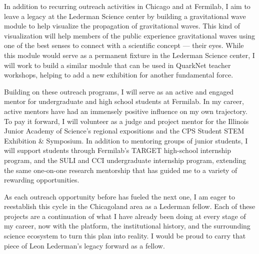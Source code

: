 \documentclass[11pt]{article}
\begin{document}
In addition to recurring outreach activities in Chicago and at Fermilab, I aim to leave a legacy at the Lederman Science center by building a gravitational wave module to help visualize the propagation of gravitational waves. This kind of visualization will help members of the public experience gravitational waves using one of the best senses to connect with a scientific concept --- their eyes.
While this module would serve as a permanent fixture in the Lederman Science center, I will work to build a similar module that can be used in QuarkNet teacher workshops, helping to add a new exhibition for another fundamental force.

Building on these outreach programs, I will serve as an active and engaged mentor for undergraduate and high school students at Fermilab. In my career, active mentors have had an immensely positive influence on my own trajectory. 
To pay it forward, 
I will volunteer as a judge and project mentor for the Illinois Junior Academy of Science's regional expositions and the CPS Student STEM Exhibition \& Symposium. 
In addition to mentoring groups of junior students, I will support students through Fermilab's TARGET high-school internship program, and the SULI and CCI undergraduate internship program, extending the same one-on-one research mentorship that has guided me to a variety of rewarding opportunities.

As each outreach opportunity before has fueled the next one, I am eager to reestablish this cycle in the Chicagoland area as a Lederman fellow.
Each of these projects are a continuation of what I have already been doing at every stage of my career, 
now with the platform, the institutional history, and the surrounding science ecosystem to turn this plan into reality. 
I would be proud to carry that piece of Leon Lederman's legacy forward as a fellow.
\end{document}
